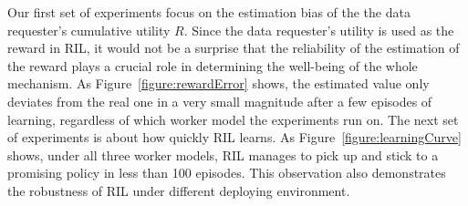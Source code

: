 %

Our first set of experiments focus on the estimation bias of the the data requester's cumulative utility $R$.
Since the data requester's utility is used as the reward in RIL, it would not be a surprise that the reliability of the estimation of the reward plays a crucial role in determining the well-being of the whole mechanism. As Figure~\ref{figure:rewardError} shows, the estimated value only deviates from the real one in a very small magnitude after a few episodes of learning, regardless of which worker model the experiments run on.
The next set of experiments is about how quickly RIL learns. As Figure~\ref{figure:learningCurve} shows, under all three worker models, RIL manages to pick up and stick to a promising policy %
in less than 100 episodes. 
This observation also demonstrates the robustness of RIL under different deploying environment.

